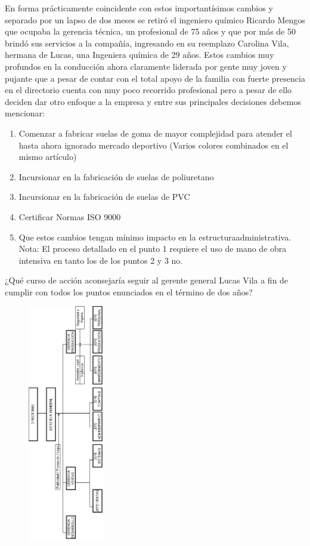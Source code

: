 \documentclass[a4paper,10pt]{article}
\begin{document}
	En forma prácticamente coincidente con estos importantísimos cambios y separado por un lapso de dos meses se retiró el ingeniero químico Ricardo Mengos que ocupaba la gerencia técnica, un profesional de 75 años y que por más de 50 brindó sus servicios a la compañía, ingresando en su reemplazo Carolina Vila, hermana de Lucas, una Ingeniera química de 29 años.\newline
	Estos cambios muy profundos en la conducción ahora claramente liderada por gente muy joven y pujante que a pesar de contar con el total apoyo de la familia con fuerte presencia en el directorio cuenta con muy poco recorrido profesional pero a pesar de ello deciden dar otro enfoque a la empresa y entre sus principales decisiones debemos mencionar:\newline
	\begin{enumerate}
	\item Comenzar a fabricar suelas de goma de mayor complejidad para atender el hasta ahora ignorado mercado deportivo (Varios colores combinados en el mismo artículo)
	\item Incursionar en la fabricación de suelas de poliuretano
	\item Incursionar en la fabricación de suelas de PVC
	\item Certificar Normas ISO 9000
	\item Que estos cambios tengan mínimo impacto en la estructuraadministrativa.
	Nota: El proceso detallado en el punto 1 requiere el uso de mano de obra intensiva en tanto los de los puntos 2 y 3 no.		\end{enumerate}
	¿Qué curso de acción aconsejaría seguir al gerente general Lucas Vila a fin de cumplir con todos los puntos enunciados en el término de dos años?
		\newpage
				\begin{figure}
				    \includegraphics[width=0.3\textwidth]{imagenes/imagenLosGringos.png}
				\end{figure}
				\newpage
\end{document}

